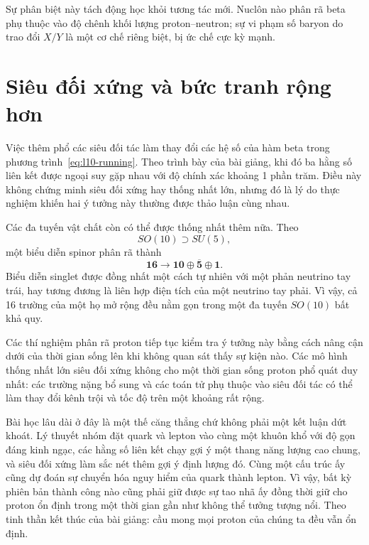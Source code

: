 Sự phân biệt này tách động học khỏi tương tác mới. Nuclôn nào phân rã beta phụ thuộc vào độ chênh khối lượng proton--neutron; sự vi phạm số baryon do trao đổi \(X/Y\) là một cơ chế riêng biệt, bị ức chế cực kỳ mạnh.

\section{Siêu đối xứng và bức tranh rộng hơn}

Việc thêm phổ các siêu đối tác làm thay đổi các hệ số của hàm beta trong phương trình~\eqref{eq:l10-running}. Theo trình bày của bài giảng, khi đó ba hằng số liên kết được ngoại suy gặp nhau với độ chính xác khoảng 1 phần trăm. Điều này không chứng minh siêu đối xứng hay thống nhất lớn, nhưng đó là lý do thực nghiệm khiến hai ý tưởng này thường được thảo luận cùng nhau.

Các đa tuyến vật chất còn có thể được thống nhất thêm nữa. Theo
\begin{equation}
SO(10)\supset SU(5),
\end{equation}
một biểu diễn spinor phân rã thành
\begin{equation}
\mathbf{16}
\longrightarrow
\mathbf{10}\oplus\overline{\mathbf5}\oplus\mathbf1.
\label{eq:l10-so10}
\end{equation}
Biểu diễn singlet được đồng nhất một cách tự nhiên với một phản neutrino tay trái, hay tương đương là liên hợp điện tích của một neutrino tay phải. Vì vậy, cả 16 trường của một họ mở rộng đều nằm gọn trong một đa tuyến \(SO(10)\) bất khả quy.

Các thí nghiệm phân rã proton tiếp tục kiểm tra ý tưởng này bằng cách nâng cận dưới của thời gian sống lên khi không quan sát thấy sự kiện nào. Các mô hình thống nhất lớn siêu đối xứng không cho một thời gian sống proton phổ quát duy nhất: các trường nặng bổ sung và các toán tử phụ thuộc vào siêu đối tác có thể làm thay đổi kênh trội và tốc độ trên một khoảng rất rộng.


Bài học lâu dài ở đây là một thế căng thẳng chứ không phải một kết luận dứt khoát. Lý thuyết nhóm đặt quark và lepton vào cùng một khuôn khổ với độ gọn đáng kinh ngạc, các hằng số liên kết chạy gợi ý một thang năng lượng cao chung, và siêu đối xứng làm sắc nét thêm gợi ý định lượng đó. Cùng một cấu trúc ấy cũng dự đoán sự chuyển hóa nguy hiểm của quark thành lepton. Vì vậy, bất kỳ phiên bản thành công nào cũng phải giữ được sự tao nhã ấy đồng thời giữ cho proton ổn định trong một thời gian gần như không thể tưởng tượng nổi. Theo tinh thần kết thúc của bài giảng: cầu mong mọi proton của chúng ta đều vẫn ổn định.
